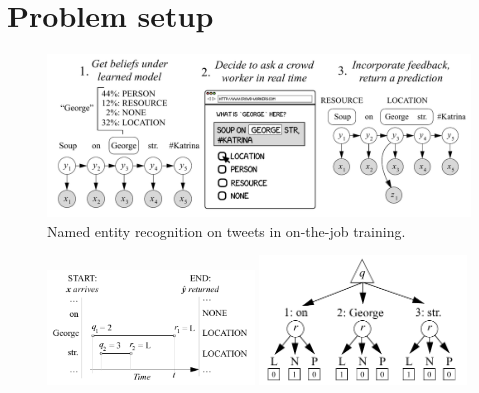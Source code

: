 \section{Problem setup}
\label{sec:model}

\begin{figure}[t]
  \begin{centering}
  \includegraphics[width=1.0\textwidth]{figures/intro-banner.pdf}
  \end{centering}
  \caption{
    Named entity recognition on tweets in on-the-job training.
}
\label{fig:crf}
\end{figure}

\begin{figure}[t]
  \begin{centering}
  \includegraphics[width=0.49\textwidth]{figures/piano-roll.pdf}
  \hfill
 \includegraphics[width=0.49\textwidth,height=0.23\textheight,keepaspectratio]{figures/single-move.pdf}
  \end{centering}
  \caption{
  }
\label{fig:piano-roll}
\end{figure}

